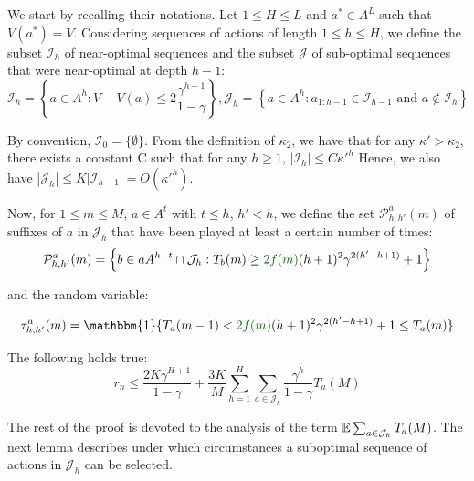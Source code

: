 We start by recalling their notations.
Let $1 \leq H \leq L$ and $a^* \in A^L$ such that $V(a^*) = V$.
Considering sequences of actions of length $1 \leq h \leq H$, we define the subset $\mathcal{I}_h$ of near-optimal sequences and the subset $\mathcal{J}$ of sub-optimal sequences that were near-optimal at depth $h-1$:
\begin{equation*}
\mathcal{I}_h = \left\{a \in A^h: V - V(a) \leq 2\frac{\gamma^{h+1}}{1-\gamma}\right\}, \mathcal{J}_h = \left\{a \in A^h: a_{1:h-1} \in \mathcal{I}_{h-1} \text{ and } a \not\in \mathcal{I}_h\right\}
\end{equation*}

By convention, $\mathcal{I}_0 = \{\emptyset\}$. From the definition of $\kappa_2$, we have that for any $\kappa'>\kappa_2$, there exists a constant C such that for any $h \geq 1$,
$|\mathcal{I}_h| \leq C {\kappa'}^h$
Hence, we also have $|\mathcal{J}_h| \leq K|\mathcal{I}_{h-1}| = O({\kappa'}^h)$.

Now, for $1\leq m \leq M$, $a \in A^t$ with $t \leq h$, $h'<h$, we define the set $\mathcal{P}^a_{h,h'}(m)$ of suffixes of $a$ in $\mathcal{J}_h$ that have been played at least a certain number of times:
\begin{equation*}
\mathcal{P}^a_{h,h'}(m) = \left\{ b\in a A^{h-t}\cap \mathcal{J}_h : T_b(m) \geq \diff{2f(m)}(h+1)^2\gamma^{2(h'-h+1)} + 1 \right\}
\end{equation*}

and the random variable:

\begin{equation*}
\tau^a_{h,h'}(m) = \mathbbm{1}\{T_a(m-1) < \diff{2f(m)}(h+1)^2\gamma^{2(h'-h+1)} + 1 \leq T_a(m)\}
\end{equation*}

\begin{lemma}
	\label{lemma:expected-regret}
	\begin{leftbar}[lemmabar]
	The following holds true:
	\begin{equation*}
	r_n \leq \frac{2K \gamma^{H+1}}{1-\gamma} +\frac{3K}{M}\sum_{h=1}^H\sum_{a\in\mathcal{J}_h}\frac{\gamma^h}{1-\gamma}T_a(M)
	\end{equation*}
	\end{leftbar}
\end{lemma}


The rest of the proof is devoted to the analysis of the term $\operatorname*{\mathbb{E}} \sum_{a\in \mathcal{J}_h} T_a(M)$. The next lemma describes under which circumstances a suboptimal sequence of actions in $\mathcal{J}_h$ can be selected.

